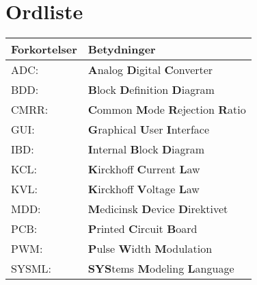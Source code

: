 \section*{Ordliste}
\begin{center}
		\begin{longtable}{ | m{6.5cm} | m{6.5cm}| } 
			\hline
			\textbf{Forkortelser} &\textbf{Betydninger} \\ 
			\hline	
			ADC: & \textbf{A}nalog \textbf{D}igital \textbf{C}onverter  \\ 
							
			\hline
			BDD: & \textbf{B}lock \textbf{D}efinition \textbf{D}iagram \\
\hline
			CMRR: & \textbf{C}ommon \textbf{M}ode \textbf{R}ejection \textbf{R}atio \\ 			
			\hline
			GUI: & \textbf{G}raphical \textbf{U}ser \textbf{I}nterface \\
			\hline
			
			IBD: & \textbf{I}nternal \textbf{B}lock \textbf{D}iagram \\  
\hline
			KCL: & \textbf{K}irckhoff \textbf{C}urrent \textbf{L}aw \\ 
			\hline
			KVL: & \textbf{K}irckhoff \textbf{V}oltage \textbf{L}aw \\ 			
			\hline
			MDD: & \textbf{M}edicinsk \textbf{D}evice \textbf{D}irektivet \\ 			
			\hline
			PCB: & \textbf{P}rinted \textbf{C}ircuit \textbf{B}oard \\ 			
			
			\hline
			PWM: & \textbf{P}ulse \textbf{W}idth \textbf{M}odulation \\ 
			
			\hline
			SYSML: & \textbf{SYS}tems \textbf{M}odeling \textbf{L}anguage \\ 
			
			
			
			
			
			 
			
			
			
			
			
			\hline
		\end{longtable}
\end{center}